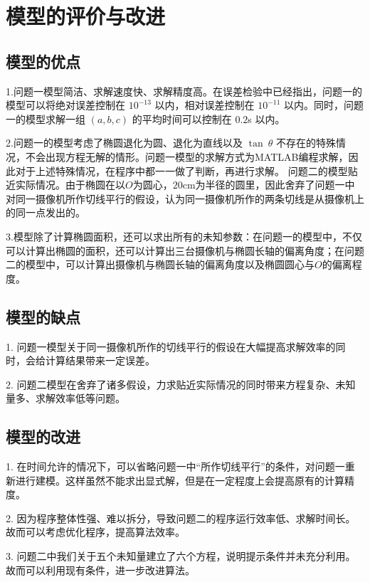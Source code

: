 \documentclass[a4paper,10.5pt]{ctexart}
\begin{document}
\section{模型的评价与改进}
\subsection{模型的优点}
\par 1.问题一模型简洁、求解速度快、求解精度高。在误差检验中已经指出，问题一的模型可以将绝对误差控制在 $10^{-13}$ 以内，相对误差控制在 $10^{-11}$ 以内。同时，问题一的模型求解一组 $(a,b,c)$ 的平均时间可以控制在 $0.2$s 以内。

2.问题一的模型考虑了椭圆退化为圆、退化为直线以及 $\tan\ \theta$ 不存在的特殊情况，不会出现方程无解的情形。问题一模型的求解方式为MATLAB编程求解，因此对于上述特殊情况，在程序中都一一做了判断，再进行求解。
问题二的模型贴近实际情况。由于椭圆在以$ O $为圆心，$20$cm为半径的圆里，因此舍弃了问题一中对同一摄像机所作切线平行的假设，认为同一摄像机所作的两条切线是从摄像机上的同一点发出的。

3.模型除了计算椭圆面积，还可以求出所有的未知参数：在问题一的模型中，不仅可以计算出椭圆的面积，还可以计算出三台摄像机与椭圆长轴的偏离角度；在问题二的模型中，可以计算出摄像机与椭圆长轴的偏离角度以及椭圆圆心与$ O $的偏离程度。



\subsection{模型的缺点}
\par 1. 问题一模型关于同一摄像机所作的切线平行的假设在大幅提高求解效率的同时，会给计算结果带来一定误差。

2. 问题二模型在舍弃了诸多假设，力求贴近实际情况的同时带来方程复杂、未知量多、求解效率低等问题。
\subsection{模型的改进}
\par 1. 在时间允许的情况下，可以省略问题一中“所作切线平行”的条件，对问题一重新进行建模。这样虽然不能求出显式解，但是在一定程度上会提高原有的计算精度。

2. 因为程序整体性强、难以拆分，导致问题二的程序运行效率低、求解时间长。故而可以考虑优化程序，提高算法效率。

3. 问题二中我们关于五个未知量建立了六个方程，说明提示条件并未充分利用。故而可以利用现有条件，进一步改进算法。
\clearpage
\end{document}
